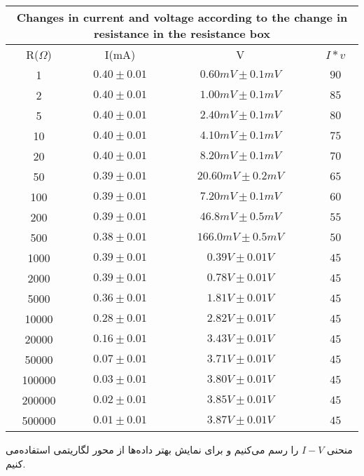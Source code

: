 \documentclass{article}
\begin{document}
\begin{latin}
\vspace{3cm}
\begin{center}
\begin{table}[h!]
\centering

\setlength{\tabcolsep}{20pt}
\renewcommand{\arraystretch}{2}

\begin{tabular}{|c|c|c|c|}
\hline
\multicolumn{4}{|c|}{Changes in current and voltage according to the change in resistance in the resistance box} \\
	\hline
	R($\Omega$) & I(mA) & V & $I*v$\\
	\hline
	1&$0.40\pm0.01$ &$0.60mV\pm0.1mV$& $90$ \\ 
	\hline
	2&$0.40\pm0.01$ &$1.00mV\pm0.1mV$& $85$ \\
	\hline
	5&$0.40\pm0.01$ &$2.40mV\pm0.1mV$& $80$ \\
	\hline
	10&$0.40\pm0.01$ &$4.10mV\pm0.1mV$& $75$ \\
	\hline
	20&$0.40\pm0.01$ &$8.20mV\pm0.1mV$& $70$ \\
	\hline
	50&$0.39\pm0.01$ &$20.60mV\pm0.2mV$& $65$ \\
	\hline
	100&$0.39\pm0.01$ &$7.20mV\pm0.1mV$& $60$ \\
	\hline
	200&$0.39\pm0.01$ &$46.8mV\pm0.5mV$& $55$ \\
	\hline
	500&$0.38\pm0.01$ &$166.0mV\pm0.5mV$& $50$ \\
	\hline
	1000&$0.39\pm0.01$ &$0.39V\pm0.01V$& $45$ \\
	\hline
	2000&$0.39\pm0.01$ &$0.78V\pm0.01V$& $45$ \\
	\hline
	5000&$0.36\pm0.01$ &$1.81V\pm0.01V$& $45$ \\
	\hline
	10000&$0.28\pm0.01$ &$2.82V\pm0.01V$& $45$ \\
	\hline
	20000&$0.16\pm0.01$ &$3.43V\pm0.01V$& $45$ \\
	\hline
	50000&$0.07\pm0.01$ &$3.71V\pm0.01V$& $45$ \\
	\hline
	100000&$0.03\pm0.01$ &$3.80V\pm0.01V$& $45$ \\
	\hline
	200000&$0.02\pm0.01$ &$3.85V\pm0.01V$& $45$ \\
	\hline
	500000&$0.01\pm0.01$ &$3.87V\pm0.01V$& $45$ \\
	\hline
\end{tabular}
\caption{}
\end{table}
\end{center}
\end{latin}
\newpage
منحنی $I-V$ را رسم ‌می‌کنیم و برای نمایش بهتر داده‌ها از محور لگاریتمی استفاده‌می کنیم.
\end{document}
